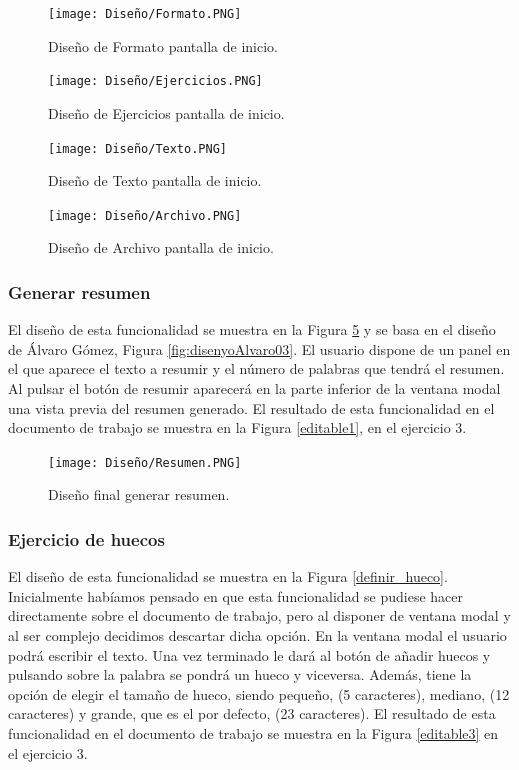 \begin{figure}[ht!]
  \centering
  \texttt{[image: Diseño/Formato.PNG]}
  \caption{Diseño de Formato pantalla de inicio.}
  \label{Forato}
\end{figure}

\begin{figure}[ht!]
  \centering
  \texttt{[image: Diseño/Ejercicios.PNG]}
  \caption{Diseño de Ejercicios pantalla de inicio.}
  \label{ejercicios}
\end{figure}

\begin{figure}[ht!]
  \centering
  \texttt{[image: Diseño/Texto.PNG]}
  \caption{Diseño de Texto pantalla de inicio.}
  \label{texto}
\end{figure}

\begin{figure}[ht!]
  \centering
  \texttt{[image: Diseño/Archivo.PNG]}
  \caption{Diseño de Archivo pantalla de inicio.}
  \label{archivo}
\end{figure}

\subsubsection{Generar resumen}
El diseño de esta funcionalidad se muestra en la Figura \ref{resuemn} y se basa en el diseño de Álvaro Gómez, Figura \ref{fig:disenyoAlvaro03}. El usuario dispone de un panel en el que aparece el texto a resumir y el número de palabras que tendrá el resumen. Al pulsar el botón de resumir aparecerá en la parte inferior de la ventana modal una vista previa del resumen generado. El resultado de esta funcionalidad en el documento de trabajo se muestra en la Figura \ref{editable1}, en el ejercicio 3.

\begin{figure}[ht!]
  \centering
  \texttt{[image: Diseño/Resumen.PNG]}
  \caption{Diseño final generar resumen.}
  \label{resuemn}
\end{figure}

\subsubsection{Ejercicio de huecos}
El diseño de esta funcionalidad se muestra en la Figura \ref{definir_hueco}. Inicialmente habíamos pensado en que esta funcionalidad se pudiese hacer directamente sobre el documento de trabajo, pero al disponer de ventana modal y al ser complejo decidimos descartar dicha opción. En la ventana modal el usuario podrá escribir el texto. Una vez terminado le dará al botón de añadir huecos y pulsando sobre la palabra se pondrá un hueco y viceversa. Además, tiene la opción de elegir el tamaño de hueco, siendo pequeño, (5 caracteres), mediano, (12 caracteres) y grande, que es el por defecto, (23 caracteres). El resultado de esta funcionalidad en el documento de trabajo se muestra en la Figura \ref{editable3} en el ejercicio 3.

